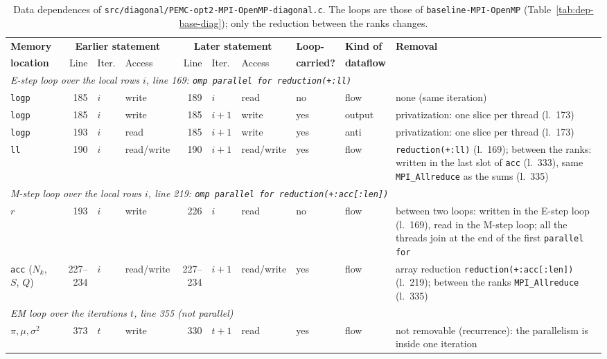 \documentclass[conference,onecolumn]{IEEEtran}
\newcommand{\vbase}{\texttt{baseline-\allowbreak MPI-\allowbreak OpenMP}}
\begin{document}
\begin{table}[H]
\centering
\caption{Data dependences of \texttt{src/diagonal/PEMC-opt2-MPI-OpenMP-diagonal.c}. The loops are those of \vbase{} (Table~\ref{tab:dep-base-diag}); only the reduction between the ranks changes.}\label{tab:dep-opt2-diag}
\scriptsize
\setlength{\tabcolsep}{3pt}
\begin{tabular}{lrllrllllp{}}
\toprule
\textbf{Memory} & \multicolumn{3}{c}{\textbf{Earlier statement}} & \multicolumn{3}{c}{\textbf{Later statement}} & \textbf{Loop-} & \textbf{Kind of} & \textbf{Removal} \\
\cmidrule(lr){2-4} \cmidrule(lr){5-7}
\textbf{location} & Line & Iter. & Access & Line & Iter. & Access & \textbf{carried?} & \textbf{dataflow} & \\
\midrule
\multicolumn{10}{p{0.92\textwidth}}{\emph{E-step loop over the local rows $i$, line 169: \texttt{omp parallel for reduction(+:ll)}}} \\
\texttt{logp} & 185 & $i$ & write & 189 & $i$ & read & no & flow & none (same iteration) \\
\texttt{logp} & 185 & $i$ & write & 185 & $i+1$ & write & yes & output & privatization: one slice per thread (l.~173) \\
\texttt{logp} & 193 & $i$ & read & 185 & $i+1$ & write & yes & anti & privatization: one slice per thread (l.~173) \\
\texttt{ll} & 190 & $i$ & read/write & 190 & $i+1$ & read/write & yes & flow & \texttt{reduction(+:ll)} (l.~169); between the ranks: written in the last slot of \texttt{acc} (l.~333), same \texttt{MPI\_Allreduce} as the sums (l.~335) \\
\midrule
\multicolumn{10}{p{0.92\textwidth}}{\emph{M-step loop over the local rows $i$, line 219: \texttt{omp parallel for reduction(+:acc[:len])}}} \\
$r$ & 193 & $i$ & write & 226 & $i$ & read & no & flow & between two loops: written in the E-step loop (l.~169), read in the M-step loop; all the threads join at the end of the first \texttt{parallel for} \\
\texttt{acc} ($N_k$, $S$, $Q$) & 227--234 & $i$ & read/write & 227--234 & $i+1$ & read/write & yes & flow & array reduction \texttt{reduction(+:acc[:len])} (l.~219); between the ranks \texttt{MPI\_Allreduce} (l.~335) \\
\midrule
\multicolumn{10}{p{0.92\textwidth}}{\emph{EM loop over the iterations $t$, line 355 (not parallel)}} \\
$\pi,\mu,\sigma^2$ & 373 & $t$ & write & 330 & $t+1$ & read & yes & flow & not removable (recurrence): the parallelism is inside one iteration \\
\bottomrule
\end{tabular}
\end{table}
\end{document}
